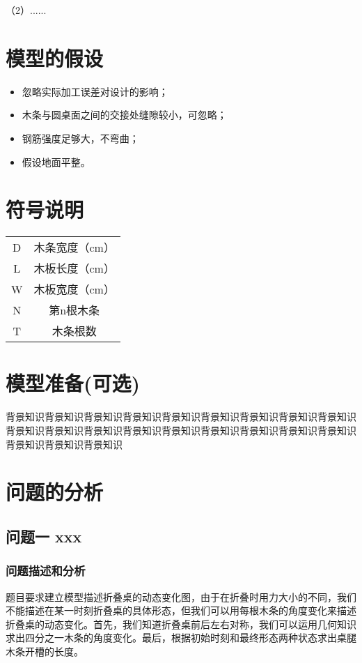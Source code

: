 \documentclass{cumcmthesis}
\begin{document}
	（2）......


	\section{模型的假设}
	\begin{itemize}
		\item 忽略实际加工误差对设计的影响；
		\item 木条与圆桌面之间的交接处缝隙较小，可忽略；
		\item 钢筋强度足够大，不弯曲；
		\item 假设地面平整。
	\end{itemize}


	\section{符号说明}
	\begin{center}
		\begin{tabular}{cc}
			\hline
			\makebox[0.3\textwidth][c]{符号}	&  \makebox[0.4\textwidth][c]{意义} \\ \hline
			D	    & 木条宽度（cm） \\ \hline
			L	    & 木板长度（cm）  \\ \hline
			W	    & 木板宽度（cm）  \\ \hline
			N	    & 第n根木条  \\ \hline
			T	    & 木条根数  \\ \hline
		\end{tabular}
	\end{center}


	\section{模型准备(可选)}
	背景知识背景知识背景知识背景知识背景知识背景知识背景知识背景知识背景知识背景知识背景知识背景知识背景知识背景知识背景知识背景知识背景知识背景知识背景知识背景知识背景知识


	
	\section{问题的分析}
	\subsection{问题一 xxx}
	\subsubsection{问题描述和分析}
	题目要求建立模型描述折叠桌的动态变化图，由于在折叠时用力大小的不同，我们不能描述在某一时刻折叠桌的具体形态，但我们可以用每根木条的角度变化来描述折叠桌的动态变化。首先，我们知道折叠桌前后左右对称，我们可以运用几何知识求出四分之一木条的角度变化。最后，根据初始时刻和最终形态两种状态求出桌腿木条开槽的长度。
	
\end{document}
